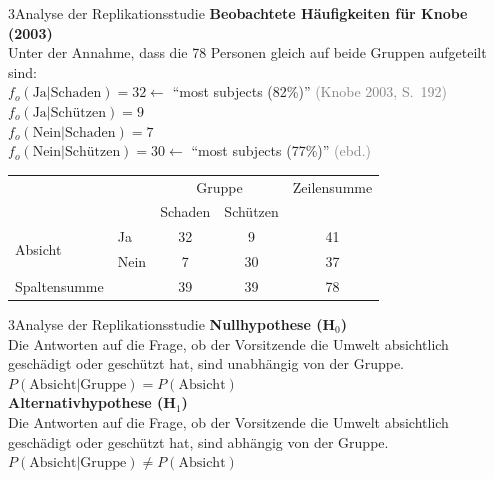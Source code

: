 \documentclass[xcolor=table,9pt,aspectratio=169]{beamer}
\begin{document}
\begin{frame}{\vspace*{10mm}3\hspace*{1em}Analyse der Replikationsstudie}
\textbf{Beobachtete Häufigkeiten für Knobe (2003)}\\
\smallskip
Unter der Annahme, dass die 78 Personen gleich auf beide Gruppen aufgeteilt sind:\\
\smallskip
$f_{o}(\text{Ja}|\text{Schaden})=32$\hspace{2em}$\leftarrow$ \enquote{most subjects (82\%)} \textcolor{gray}{(Knobe 2003, S.~192)}\\
$f_{o}(\text{Ja}|\text{Schützen})=9$\\
$f_{o}(\text{Nein}|\text{Schaden})=7$\\
$f_{o}(\text{Nein}|\text{Schützen})=30$\hspace{2em}$\leftarrow$ \enquote{most subjects (77\%)} \textcolor{gray}{(ebd.)}\\

\bigskip
\begin{tabular}{llccc}
   \arrayrulecolor{blue2}\hline
                              &        & \multicolumn{2}{c}{Gruppe}   & Zeilensumme   \\
                              &        & Schaden   & Schützen         &               \\
   \hline
   \multirow{2}{*}{Absicht}   & Ja     & 32        &  9               & 41            \\
                              & Nein   &  7        & 30               & 37            \\
   \hline
   Spaltensumme               &        & 39        & 39               & 78            \\
   \hline
\end{tabular}
\end{frame}


\begin{frame}{\vspace*{10mm}3\hspace*{1em}Analyse der Replikationsstudie}
\textbf{Nullhypothese (H$_{0}$)}\\
\smallskip
Die Antworten auf die Frage, ob der Vorsitzende die Umwelt absichtlich geschädigt oder geschützt hat, sind unabhängig von der Gruppe.\\
\smallskip
$P(\text{Absicht}|\text{Gruppe})=P(\text{Absicht})$\\

\bigskip
\textbf{Alternativhypothese (H$_{1}$)}\\
\smallskip
Die Antworten auf die Frage, ob der Vorsitzende die Umwelt absichtlich geschädigt oder geschützt hat, sind abhängig von der Gruppe.\\
\smallskip
$P(\text{Absicht}|\text{Gruppe})\neq P(\text{Absicht})$\\
\end{frame}
\end{document}
